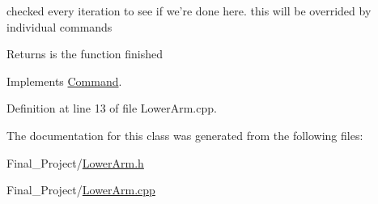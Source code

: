 checked every iteration to see if we're done here. this will be overrided by individual commands 

\begin{DoxyReturn}{Returns}
is the function finished 
\end{DoxyReturn}


Implements \hyperlink{classCommand_a9aa704d5f9d98f510a79e645701dc72a}{Command}.



Definition at line 13 of file Lower\-Arm.\-cpp.



The documentation for this class was generated from the following files\-:\begin{DoxyCompactItemize}
\item 
Final\-\_\-\-Project/\hyperlink{LowerArm_8h}{Lower\-Arm.\-h}\item 
Final\-\_\-\-Project/\hyperlink{LowerArm_8cpp}{Lower\-Arm.\-cpp}\end{DoxyCompactItemize}
